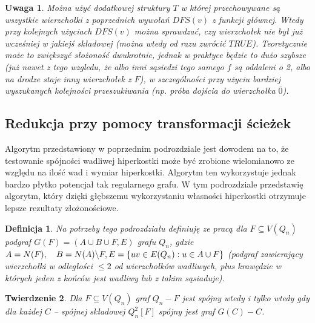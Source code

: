 \documentclass{pracamgr}
\newtheorem{defi}{Definicja}[section] %
\newtheorem{theorem}{Twierdzenie}
\newtheorem{remark}[theorem]{Uwaga}
\begin{document}
     \begin{remark}\label{dwie struktury T}
      Można użyć dodatkowej struktury $T$ w której przechowywane są wszystkie wierzchołki z poprzednich wywołań $DFS(v)$ z funkcji głównej.
      Wtedy przy kolejnych użyciach $DFS(v)$ można sprawdzać, czy wierzchołek nie był już wcześniej w jakiejś składowej (można wtedy od razu zwrócić $TRUE$).
      Teoretycznie może to zwiększyć słożoność dwukrotnie, jednak w praktyce będzie to dużo szybsze
      (już nawet z tego wzgledu, że albo inni sąsiedzi tego samego $f$ są oddaleni o 2, albo na drodze staje inny wierzchołek z $F$),
      w szczególności przy użyciu bardziej wyszukanych kolejności przeszukiwania (np. próba dojścia do wierzchołka $\overline{0}$).
     \end{remark}

     
   \subsection{Redukcja przy pomocy transformacji ścieżek}\label{spojnosc 2}
    Algorytm przedstawiony w poprzednim podrozdziale jest dowodem na to, że testowanie spójności wadliwej hiperkostki może być zrobione wielomianowo
    ze względu na ilość wad i wymiar hiperkostki. Algorytm ten wykorzystuje jednak bardzo płytko potencjał tak regularnego grafu.
    W tym podrozdziale przedstawię algorytm, który dzięki głębszemu wykorzystaniu własności hiperkostki otrzymuje lepsze rezultaty złożonościowe.
    \begin{defi}\label{podgrafy kostki}
     Na potrzeby tego podrozdziału definiuję ze pracą \cite{DFGKR} dla $F\subseteq V(Q_n)$\newline
     podgraf $G(F)=(A\cup B\cup F,E)$ grafu $Q_n$,
     gdzie $A=N(F),\quad B=N(A)\backslash F,\newline E=\{uv\in E(Q_n):u\in A\cup F\}$ (podgraf zawierający wierzchołki w odległości $\le 2$ od wierzchołków wadliwych,
     plus krawędzie w których jeden z końców jest wadliwy lub z takim sąsiaduje).
    \end{defi}
    \begin{theorem}\label{spojnosc z lokalnej spojnosci}
     Dla $F\subseteq V(Q_n)$ graf $Q_n-F$ jest spójny wtedy i tylko wtedy gdy dla każdej $C$ -- spójnej składowej $Q_n^2[F]$ spójny jest graf $G(C)-C$.
    \end{theorem}
\end{document}

